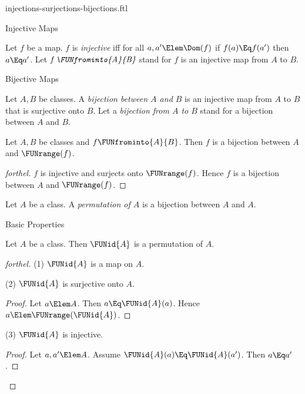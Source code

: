 \documentclass{stex}
\begin{document}
\begin{smodule}{injections-surjections-bijections.ftl}
\begin{sfragment}{Injective Maps}
  \begin{definition}[forthel,for={injective,FUNfrominto}]
    Let $f$ be a map.
    $f$ is \emph{injective} iff for all $a, a' \Elem \Dom(f)$ if $f(a) \Eq f(a')$ then $a \Eq a'$.
    Let $\emph{f \FUNfrominto{A}{B}}$ stand for $f$ is an injective map from $A$ to $B$.
  \end{definition}
\end{sfragment}

\begin{sfragment}{Bijective Maps}
  \begin{definition}[forthel,for=bijection]
    Let $A, B$ be classes.
    A \emph{bijection between $A$ and $B$} is an injective map from $A$ to $B$ that is surjective onto $B$.
    Let a \emph{bijection from $A$ to $B$} stand for a bijection between $A$ and $B$.
  \end{definition}

  \begin{proposition}[forthel]
    Let $A, B$ be classes and $f \FUNfrominto{A}{B}$.
    Then $f$ is a bijection between $A$ and $\FUNrange(f)$.
  \end{proposition}
  \begin{proof}[forthel]
    $f$ is injective and surjects onto $\FUNrange(f)$.
    Hence $f$ is a bijection between $A$ and $\FUNrange(f)$.
  \end{proof}

  \begin{definition}[forthel,for=permutation]
    Let $A$ be a class.
    A \emph{permutation of $A$} is a bijection between $A$ and $A$.
  \end{definition}
\end{sfragment}

\begin{sfragment}{Basic Properties}
  \begin{proposition}[forthel]
    Let $A$ be a class.
    Then $\FUNid{A}$ is a permutation of $A$.
  \end{proposition}
  \begin{proof}[forthel]
    (1) $\FUNid{A}$ is a map on $A$.

    (2) $\FUNid{A}$ is surjective onto $A$.
    \begin{proof}
      Let $a \Elem A$.
      Then $a \Eq \FUNid{A}(a)$.
      Hence $a \Elem \FUNrange(\FUNid{A})$.
    \end{proof}

    (3) $\FUNid{A}$ is injective.
    \begin{proof}
      Let $a, a' \Elem A$.
      Assume $\FUNid{A}(a) \Eq \FUNid{A}(a')$.
      Then $a \Eq a'$.
    \end{proof}
  \end{proof}


\end{sfragment}
\end{smodule}
\end{document}
